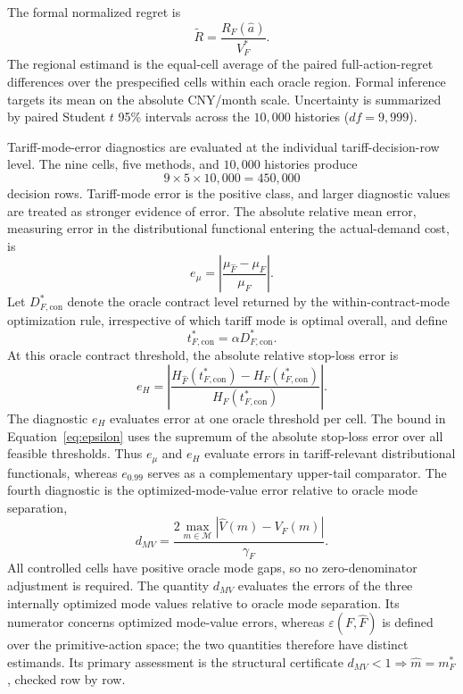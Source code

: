 \documentclass[Times1COL]{WileyNJDv5}
\begin{document}
The formal normalized regret is
\[
\widetilde R
=
\frac{R_F(\widehat a)}{V_F^\ast}.
\]
The regional estimand is the equal-cell average of the paired
full-action-regret differences over the prespecified cells within each
oracle region. Formal inference targets its mean on the absolute
CNY/month scale. Uncertainty is summarized by paired Student
$t$ 95\% intervals across the $10{,}000$ histories
($df=9{,}999$).

Tariff-mode-error diagnostics are evaluated at the individual
tariff-decision-row level. The nine cells, five methods, and $10{,}000$
histories produce
\[
9\times5\times10{,}000=450{,}000
\]
decision rows. Tariff-mode error is the positive class, and larger
diagnostic values are treated as stronger evidence of error. The
absolute relative mean error, measuring error in the distributional
functional entering the actual-demand cost, is
\begin{equation}
\label{eq:mean-error}
e_\mu
=
\left|
\frac{\mu_{\widehat F}-\mu_F}{\mu_F}
\right|.
\end{equation}
Let $D_{F,\mathrm{con}}^\ast$ denote the oracle contract level returned
by the within-contract-mode optimization rule, irrespective of which
tariff mode is optimal overall, and define
\[
t_{F,\mathrm{con}}^\ast
=
\alpha D_{F,\mathrm{con}}^\ast.
\]
At this oracle contract threshold, the absolute relative stop-loss error
is
\begin{equation}
\label{eq:stoploss-error}
e_H
=
\left|
\frac{
H_{\widehat F}(t_{F,\mathrm{con}}^\ast)
-
H_F(t_{F,\mathrm{con}}^\ast)
}{
H_F(t_{F,\mathrm{con}}^\ast)
}
\right|.
\end{equation}
The diagnostic $e_H$ evaluates error at one oracle threshold per cell.
The bound in Equation~\eqref{eq:epsilon} uses the supremum of the
absolute stop-loss error over all feasible thresholds. Thus $e_\mu$ and
$e_H$ evaluate errors in tariff-relevant distributional functionals,
whereas $e_{0.99}$ serves as a complementary upper-tail comparator.
The fourth diagnostic is the optimized-mode-value error relative to
oracle mode separation,
\[
d_{MV}
=
\frac{
2\max_{m\in\mathcal M}
\left|\widehat V(m)-V_F(m)\right|
}{
\gamma_F
}.
\]
All controlled cells have positive oracle mode gaps, so no zero-denominator
adjustment is required. The quantity $d_{MV}$ evaluates the errors of the three internally optimized mode values relative to oracle mode separation. Its numerator concerns optimized mode-value errors,
whereas $\varepsilon(F,\widehat F)$ is defined over the primitive-action
space; the two quantities therefore have distinct estimands. Its primary
assessment is the structural certificate
$d_{MV}<1\Rightarrow\widehat m=m_F^\ast$, checked row by row.
\end{document}
